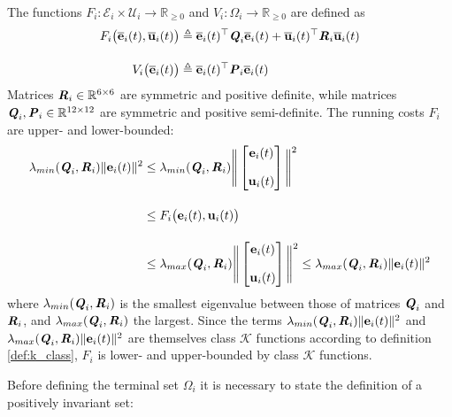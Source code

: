


The functions
$F_i : \mathcal{E}_i \times \mathcal{U}_i \to \mathbb{R}_{\geq 0}$ and
$V_i: \Omega_i \to \mathbb{R}_{\geq 0}$ are defined as
\begin{align}
  F_i \big(\overline{\bm{\mathbf{e}}}_i(t), \overline{\bm{\mathbf{u}}}_i(t)\big)
  &\triangleq \overline{\bm{\mathbf{e}}}_i(t)^{\top} \bm{\mathit{Q}}_i \overline{\bm{\mathbf{e}}}_i(t) + \overline{\bm{\mathbf{u}}}_i(t)^{\top} \bm{\mathit{R}}_i \overline{\bm{\mathbf{u}}}_i(t)\\[2.5ex]
  V_i \big(\overline{\bm{\mathbf{e}}}_i(t)\big) & \triangleq \overline{\bm{\mathbf{e}}}_i(t)^{\top} \bm{\mathit{P}}_i \overline{\bm{\mathbf{e}}}_i(t)
\end{align}
Matrices $\bm{\mathit{R}}_i \in \mathbb{R}^{6 \times 6}$ are symmetric and positive
definite, while matrices $\bm{\mathit{Q}}_i, \bm{\mathit{P}}_i \in \mathbb{R}^{12 \times 12}$
are symmetric and positive semi-definite. The running costs $F_i$ are
upper- and lower-bounded:
\begin{align}
  \lambda_{min}(\bm{\mathit{Q}}_i, \bm{\mathit{R}}_i)\|\bm{\mathbf{e}}_i(t)\|^2 &\leq
  \lambda_{min}(\bm{\mathit{Q}}_i, \bm{\mathit{R}}_i) \Bigg\| \begin{bmatrix}
      \bm{\mathbf{e}}_i(t) \\[2.5ex]
      \bm{\mathbf{u}}_i(t)
    \end{bmatrix}\Bigg\|^2  \\[2.5ex]
    &\leq F_i \big(\bm{\mathbf{e}}_i(t), \bm{\mathbf{u}}_i(t)\big) \\[2.5ex]
    &\leq \lambda_{max}(\bm{\mathit{Q}}_i, \bm{\mathit{R}}_i) \Bigg\| \begin{bmatrix}
      \bm{\mathbf{e}}_i(t) \\[2.5ex]
      \bm{\mathbf{u}}_i(t)
    \end{bmatrix}\Bigg\|^2 \leq
  \lambda_{max}(\bm{\mathit{Q}}_i, \bm{\mathit{R}}_i) \|\bm{\mathbf{e}}_i(t)\|^2
\end{align}
where $\lambda_{min}(\bm{\mathit{Q}}_i, \bm{\mathit{R}}_i)$ is the smallest eigenvalue between
those of matrices $\bm{\mathit{Q}}_i$ and $\bm{\mathit{R}}_i$, and
$\lambda_{max}(\bm{\mathit{Q}}_i, \bm{\mathit{R}}_i)$ the largest. Since the terms
$\lambda_{min}(\bm{\mathit{Q}}_i, \bm{\mathit{R}}_i) \|\bm{\mathbf{e}}_i(t)\|^2$ and
$\lambda_{max}(\bm{\mathit{Q}}_i, \bm{\mathit{R}}_i) \|\bm{\mathbf{e}}_i(t)\|^2$ are themselves
class $\mathcal{K}$ functions according to definition \eqref{def:k_class},
$F_i$ is lower- and upper-bounded by class $\mathcal{K}$ functions.


Before defining the terminal set
$\Omega_i$ it is necessary to state the definition of a positively
invariant set:

